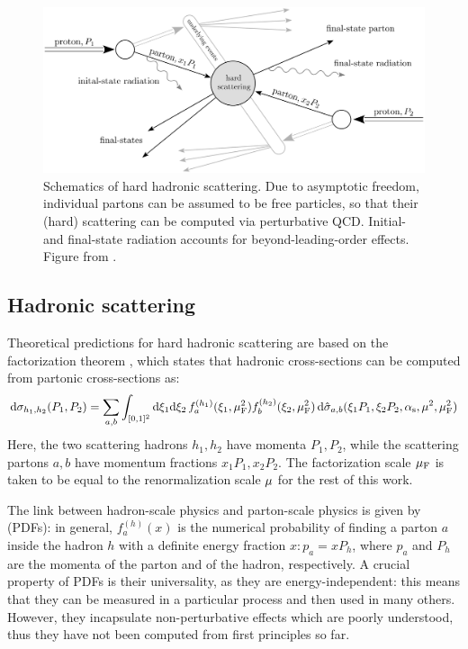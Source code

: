 \begin{figure}
  \centering
  \includegraphics[width = 0.90 \textwidth]{imgs/part-scatt.png}
  \caption{Schematics of hard hadronic scattering. Due to asymptotic freedom, individual partons can be assumed to be free particles, so that their (hard) scattering can be computed via perturbative QCD. Initial- and final-state radiation accounts for beyond-leading-order effects. Figure from \cite{Asteriadis-2020}.}
  \label{fig:part-scatt}
\end{figure}

\subsection{Hadronic scattering}

Theoretical predictions for hard hadronic scattering are based on the factorization theorem \cite{Collins-1989}, which states that hadronic cross-sections can be computed from partonic cross-sections as:
\begin{equation}
  \mathrm{d}\sigma_{h_1,h_2}(P_1 , P_2) = \sum_{a,b} \int_{[0,1]^2} \mathrm{d} \xi_1 \mathrm{d} \xi_2 \, f_a^{(h_1)}(\xi_1, \mu_\text{F}^2) f_b^{(h_2)}(\xi_2, \mu_\text{F}^2) \, \mathrm{d}\hat{\sigma}_{a,b}(\xi_1 P_1, \xi_2 P_2, \alpha_\text{s}, \mu^2, \mu_\text{F}^2)
\end{equation}
Here, the two scattering hadrons $ h_1 , h_2 $ have momenta $ P_1 , P_2 $, while the scattering partons $ a , b $ have momentum fractions $ x_1 P_1 , x_2 P_2 $. The factorization scale $ \mu_\text{F} $ is taken to be equal to the renormalization scale $ \mu $ for the rest of this work.

The link between hadron-scale physics and parton-scale physics is given by  (PDFs): in general, $ f_a^{(h)}(x) $ is the numerical probability of finding a parton $ a $ inside the hadron $ h $ with a definite energy fraction $ x : p_a = x P_h $, where $ p_a $ and $ P_h $ are the momenta of the parton and of the hadron, respectively. A crucial property of PDFs is their universality, as they are energy-independent: this means that they can be measured in a particular process and then used in many others. However, they incapsulate non-perturbative effects which are poorly understood, thus they have not been computed from first principles so far.

